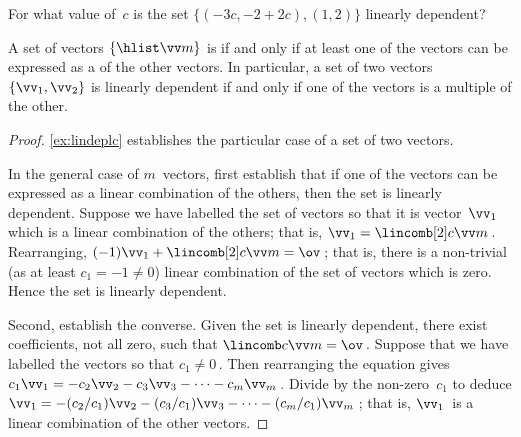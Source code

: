\begin{activity}
For what value of~\(c\) is the set \(\{(-3c,-2+2c),(1,2)\}\) linearly dependent?
\end{activity}




\begin{theorem} \label{thm:lindeplc} 
A set of vectors \(\{\hlist\vv m\}\) is  if and only if at least one of the vectors can be expressed as a  of the other vectors.
In particular, a set of two vectors \(\{\vv_1,\vv_2\}\) is linearly dependent if and only if one of the vectors is a multiple of the other.
\end{theorem}

\begin{proof} 
\autoref{ex:lindeplc} establishes the particular case of a set of two vectors.

In the general case of \(m\)~vectors, first establish that if one of the vectors can be expressed as a {linear combination} of the others, then the set is linearly dependent.
Suppose we have labelled the set of vectors so that it is vector~\(\vv_1\) which is a linear combination of the others; that is, \(\vv_1=\lincomb[2]c\vv m\)\,.
Rearranging, \((-1)\vv_1+\lincomb[2]c\vv m=\ov\)\,; that is, there is a non-trivial (as at least \(c_1=-1\neq0\)) linear combination of the set of vectors which is zero.
Hence the set is linearly dependent.

Second, establish the converse.  
Given the set is linearly dependent, there exist coefficients, not all zero, such that \(\lincomb c\vv m=\ov\)\,.  
Suppose that we have labelled the vectors so that \(c_1\neq 0\)\,.  
Then rearranging the equation gives
\(c_1\vv_1=-c_2\vv_2-c_3\vv_3-\cdots-c_m\vv_m\)\,.
Divide by the non-zero~\(c_1\) to deduce
\(\vv_1=-(c_2/c_1)\vv_2-(c_3/c_1)\vv_3-\cdots-(c_m/c_1)\vv_m\)\,;
that is, \(\vv_1\)~is a linear combination of the other vectors.
\end{proof}


